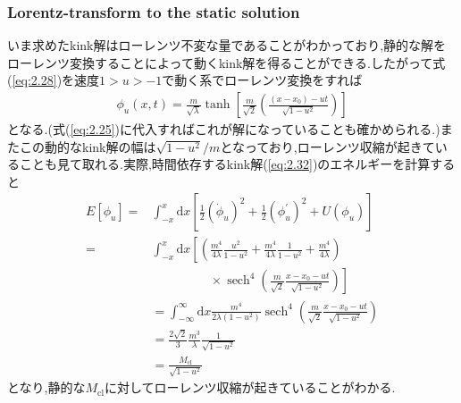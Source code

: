 \documentclass[dvipdfmx,11pt,a4paper,oneside,openany]{jsbook}
\begin{document}
\subsubsection{Lorentz-transform to the static solution}
いま求めたkink解はローレンツ不変な量であることがわかっており,静的な解をローレンツ変換することによって動くkink解を得ることができる.したがって式(\ref{eq:2.28})を速度$1>u>-1$で動く系でローレンツ変換をすれば
\begin{align}
    \phi_{u}(x, t)=\frac{m}{\sqrt{\lambda}} \tanh \left[\frac{m}{\sqrt{2}}\left(\frac{\left(x-x_{0}\right)-u t}{\sqrt{1-u^{2}}}\right)\right]\label{eq:2.32}
\end{align}
となる.(式(\ref{eq:2.25})に代入すればこれが解になっていることも確かめられる.)またこの動的なkink解の幅は$\sqrt{1-u^2}/m$となっており,ローレンツ収縮が起きていることも見て取れる.実際,時間依存するkink解(\ref{eq:2.32})のエネルギーを計算すると
\begin{align}
    E\left[\phi_{u}\right]= & \int_{-x}^{x} \mathrm{d} x\left[\frac{1}{2}\left(\dot{\phi}_{u}\right)^{2}+\frac{1}{2}\left(\phi_{u}^{'}\right)^{2}+U\left(\phi_{u}\right)\right]\nonumber                           \\
    =                       & \int_{-x}^{x} \mathrm{d} x\left[\left(\frac{m^{4}}{4 \lambda} \frac{u^{2}}{1-u^{2}}+\frac{m^{4}}{4 \lambda} \frac{1}{1-u^{2}}+\frac{m^{4}}{4 \lambda}\right)\right.\nonumber         \\
                            & \qquad\ \ \ \ \ \ \ \ \ \ \ \  \times\left.\operatorname{sech}^{4}\left(\frac{m}{\sqrt{2}} \frac{x-x_{0}-u t}{\sqrt{1-u^{2}}}\right)\right]\nonumber                                 \\
                            & =\int_{-\infty}^{\infty} \mathrm{d} x \frac{m^{4}}{2 \lambda\left(1-u^{2}\right)} \operatorname{sech}^{4}\left(\frac{m}{\sqrt{2}} \frac{x-x_{0}-u t}{\sqrt{1-u^{2}}}\right)\nonumber \\
                            & =\frac{2 \sqrt{2}}{3} \frac{m^{3}}{\lambda} \frac{1}{\sqrt{1-u^{2}}}\nonumber                                                                                                        \\
                            & =\frac{M_{\mathrm{cl}}}{\sqrt{1-u^{2}}}
\end{align}
となり,静的な$M_{\mathrm{cl}}$に対してローレンツ収縮が起きていることがわかる.
\end{document}
